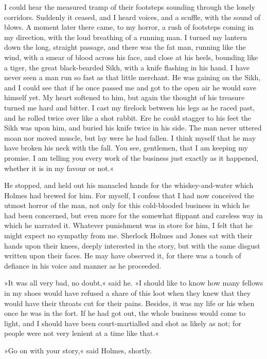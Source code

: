 I could hear the measured tramp of their footsteps sounding through the lonely corridors. Suddenly it ceased, and I heard voices, and a scuffle, with the sound of blows. A moment later there came, to my horror, a rush of footsteps coming in my direction, with the loud breathing of a running man. I turned my lantern down the long, straight passage, and there was the fat man, running like the wind, with a smear of blood across his face, and close at his heels, bounding like a tiger, the great black-bearded Sikh, with a knife flashing in his hand. I have never seen a man run so fast as that little merchant. He was gaining on the Sikh, and I could see that if he once passed me and got to the open air he would save himself yet. My heart softened to him, but again the thought of his treasure turned me hard and bitter. I cast my firelock between his legs as he raced past, and he rolled twice over like a shot rabbit. Ere he could stagger to his feet the Sikh was upon him, and buried his knife twice in his side. The man never uttered moan nor moved muscle, but lay were he had fallen. I think myself that he may have broken his neck with the fall. You see, gentlemen, that I am keeping my promise. I am telling you every work of the business just exactly as it happened, whether it is in my favour or not.«

He stopped, and held out his manacled hands for the whiskey-and-water which Holmes had brewed for him. For myself, I confess that I had now conceived the utmost horror of the man, not only for this cold-blooded business in which he had been concerned, but even more for the somewhat flippant and careless way in which he narrated it. Whatever punishment was in store for him, I felt that he might expect no sympathy from me. Sherlock Holmes and Jones sat with their hands upon their knees, deeply interested in the story, but with the same disgust written upon their faces. He may have observed it, for there was a touch of defiance in his voice and manner as he proceeded.

»It was all very bad, no doubt,« said he. »I should like to know how many fellows in my shoes would have refused a share of this loot when they knew that they would have their throats cut for their pains. Besides, it was my life or his when once he was in the fort. If he had got out, the whole business would come to light, and I should have been court-martialled and shot as likely as not; for people were not very lenient at a time like that.«

»Go on with your story,« said Holmes, shortly.

